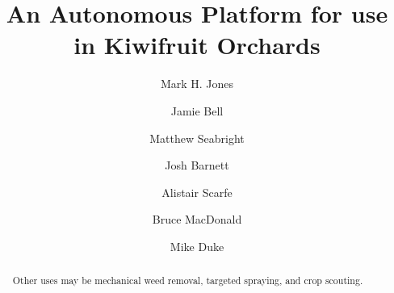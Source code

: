 \documentclass[preprint,authoryear,12pt]{elsarticle}
\begin{document}
\begin{frontmatter}



\title{An Autonomous Platform for use in Kiwifruit Orchards}



\author[UoW]{Mark H. Jones} 

\author[UoA]{Jamie Bell}
\author[UoW]{Matthew Seabright}
\author[UoW]{Josh Barnett}
\author[RPL]{Alistair Scarfe}
\author[UoA]{Bruce MacDonald}
\author[UoW]{Mike Duke}

\address[UoW]{School of Engineering, University of Waikato, Hamilton, New Zealand}
\address[UoA]{Faculty of Engineering, University of Auckland, Auckland, New Zealand}
\address[RPL]{Robotics Plus Ltd, Newnham Innovation Park, Tauranga, New Zealand}

\begin{abstract}



    Other uses may be mechanical weed removal, targeted spraying, and crop scouting.
\end{abstract}

\begin{keyword}


\end{keyword}

\end{frontmatter}
\end{document}
